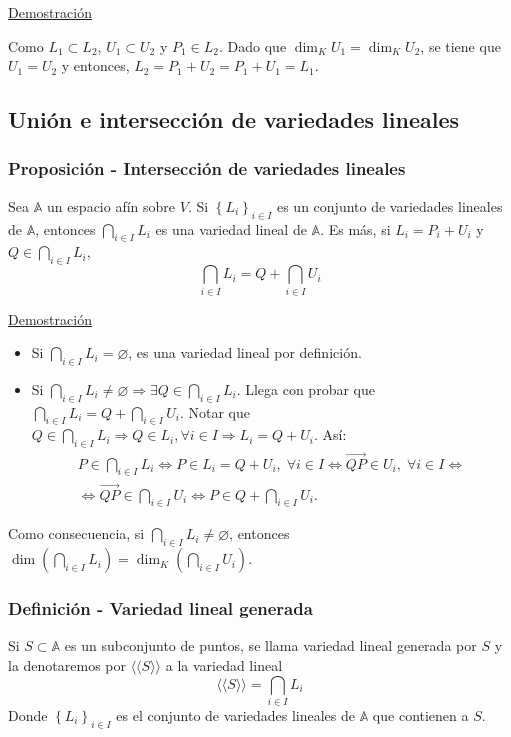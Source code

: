 \documentclass[12pt, a4paper, ones, notitlepage, openany,titlepage]{article}
\begin{document}
\noindent\underline{Demostración}

Como $L_1 \subset L_2$, $U_{1} \subset U_{2}$ y $P_{1} \in L_{2}$. Dado que $\dim _{K} U_{1}=\dim _{K} U_{2}$, se tiene que $U_{1}=U_{2}$ y entonces, $L_{2}=P_{1}+U_{2}=P_{1}+U_{1}=L_{1}$.

\subsection{Unión e intersección de variedades lineales}

\subsubsection{Proposición - Intersección de variedades lineales}
Sea $\mathbb{A}$ un espacio afín sobre $V$. Si $\left\{L_{i}\right\}_{i \in I}$ es un conjunto de variedades lineales de $\mathbb{A}$, entonces $\displaystyle\bigcap_{i \in I} L_{i}$ es una variedad lineal de $\mathbb{A}$. Es más, si $L_{i}=P_{i}+U_{i}$ y $Q \in \displaystyle \bigcap_{i \in I} L_{i}$,
$$
\bigcap_{i \in I} L_{i}=Q+\bigcap_{i \in I} U_{i}
$$

\noindent\underline{Demostración}
\begin{itemize}
	\item Si $\displaystyle\bigcap_{i \in I} L_i = \varnothing$, es una variedad lineal por definición.
	\item Si $\displaystyle\bigcap_{i \in I}L_i \neq \varnothing \Longrightarrow \exists Q \in \bigcap_{i \in I}L_i$. Llega con probar que $\displaystyle \bigcap_{i \in I}L_i = Q + \bigcap_{i \in I}U_i$. Notar que $\displaystyle Q \in \bigcap_{i \in I}L_i \Longrightarrow Q \in L_i, \forall i \in I \Longrightarrow L_i = Q + U_i$. Así:
	\begin{gather*}
		P \in \bigcap_{i \in I} L_{i} \Longleftrightarrow P \in L_{i} = Q + U_i, \; \forall i \in I \Longleftrightarrow \overrightarrow{Q P} \in U_{i}, \; \forall i \in I \Longleftrightarrow \\
		\Longleftrightarrow \overrightarrow{Q P} \in \bigcap_{i \in I} U_{i} \Longleftrightarrow P \in Q+\bigcap_{i \in I} U_{i} .
	\end{gather*}
	
\end{itemize}
Como consecuencia, si $\displaystyle \bigcap_{i \in I} L_{i} \neq \varnothing$, entonces $\displaystyle 
\dim \left(\bigcap_{i \in I} L_{i}\right)=\dim _{K}\left(\bigcap_{i \in I} U_{i}\right)$.

\subsubsection{Definición - Variedad lineal generada}
Si $S \subset \mathbb{A}$ es un subconjunto de puntos, se llama variedad lineal generada por $S$ y la denotaremos por $\langle\langle S\rangle\rangle$ a la variedad lineal
$$
\langle\langle S\rangle\rangle=\bigcap_{i \in I} L_{i}
$$
\noindent Donde $\left\{L_{i}\right\}_{i \in I}$ es el conjunto de variedades lineales de $\mathbb{A}$ que contienen a $S$.
\end{document}
